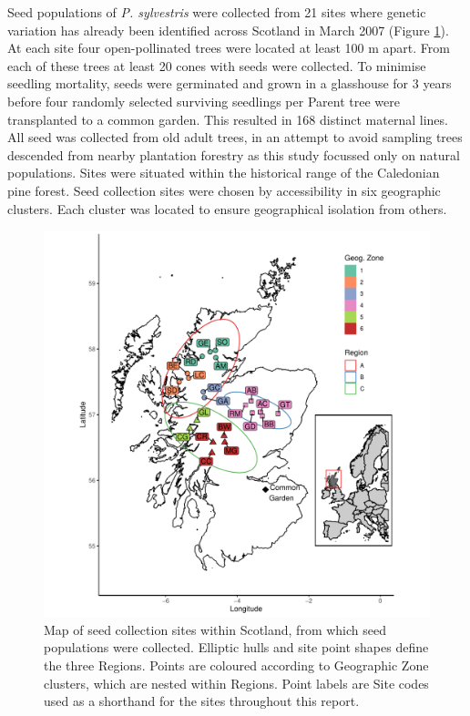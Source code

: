 \documentclass[a4paper, 11pt]{article}
\begin{document}
Seed populations of \textit{P. sylvestris} were collected from 21 sites where genetic variation has already been identified across Scotland in March 2007 (Figure \ref{site_map}). At each site four open-pollinated trees were located at least 100 m apart. From each of these trees at least 20 cones with seeds were collected. To minimise seedling mortality, seeds were germinated and grown in a glasshouse for 3 years before four randomly selected surviving seedlings per Parent tree were transplanted to a common garden. This resulted in 168 distinct maternal lines. All seed was collected from old adult trees, in an attempt to avoid sampling trees descended from nearby plantation forestry as this study focussed only on natural populations. Sites were situated within the historical range of the Caledonian pine forest. Seed collection sites were chosen by accessibility in six geographic clusters. Each cluster was located to ensure geographical isolation from others. 

\begin{figure}[H]
	\includegraphics[width=\textwidth]{site_map}
	\caption{Map of seed collection sites within Scotland, from which seed populations were collected. Elliptic hulls and site point shapes define the three Regions. Points are coloured according to Geographic Zone clusters, which are nested within Regions. Point labels are Site codes used as a shorthand for the sites throughout this report.} 
	\label{site_map}
\end{figure}
\end{document}
